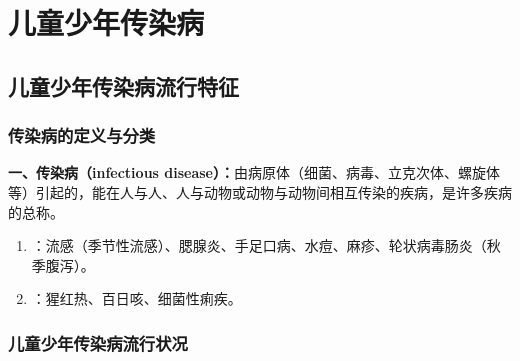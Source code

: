 \chapter{儿童少年传染病}
\setcounter{chapter}{10}

\section{儿童少年传染病流行特征}

\subsection{传染病的定义与分类}

\begin{keybox}
\textbf{一、传染病（infectious disease）：}由病原体（细菌、病毒、立克次体、螺旋体等）引起的，能在人与人、人与动物或动物与动物间相互传染的疾病，是许多疾病的总称。
\begin{enumerate}[leftmargin=*]
    \item {}：流感（季节性流感）、腮腺炎、手足口病、水痘、麻疹、轮状病毒肠炎（秋季腹泻）。
    \item {}：猩红热、百日咳、细菌性痢疾。
\end{enumerate}
\end{keybox}

\subsection{儿童少年传染病流行状况}

